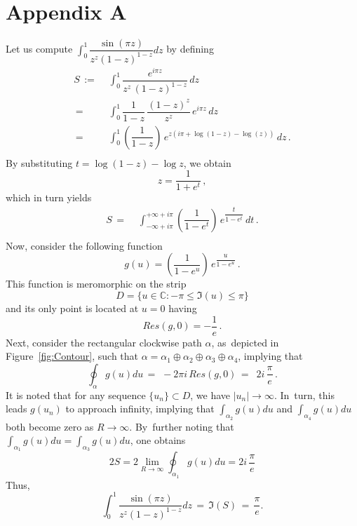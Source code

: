 \documentclass[sn-mathphys-num]{sn-jnl}%
\theoremstyle{thmstyleone}%
\theoremstyle{thmstyletwo}%
\theoremstyle{thmstylethree}%
\begin{document}
\section*{Appendix A}\label{app}
\noindent
Let us compute
$\int_{0}^{1} \dfrac{\sin (\pi z)}{z^z(1-z)^{1-z}} dz  $ by defining
\begin{equation}
	\begin{aligned}
		S
		\, := \, &  \, \int_{0}^{1} \dfrac{e^{i\pi z}}{z^z \, (1-z)^{1-z}}  \, dz   \\
		\, = \, &  \, \int_{0}^{1} \dfrac{1}{1-z} \, \dfrac{(1-z)^z}{z^z} \, e^{i\pi z} \, dz   \\
		\, = \, &  \,  \int_{0}^{1} \left(\dfrac{1}{1-z}\right) \, e^{z( i\pi + \log (1-z) - \log(z) )} \, dz \, .   \\
	\end{aligned}
\end{equation}
By substituting $t=\log (1-z) - \log z$, we obtain $$ z=\dfrac{1}{1+e^t} \, , $$ which in turn yields
\vspace{-6pt}
\begin{equation}
	\begin{aligned}
		S
		\, = \, &  \, \int_{-\infty+i\pi}^{+\infty+i\pi} \left(\dfrac{1}{1-e^t}\right) \, e^{\dfrac{t}{1-e^t}} \, dt \, .  \\
	\end{aligned}
\end{equation}
Now, consider the following function
\vspace{-3pt}
\begin{equation}
	g(u) =\left(\dfrac{1}{1-e^u}\right) \, e^{\dfrac{u}{1-e^u}} \, .
\end{equation}
This function is meromorphic on the strip $$ D = \{ u\in \mathbb{C}: -\pi \leq \Im(u) \leq \pi \} $$ and its only point is located at $u=0$ having
\begin{equation}
	Res(g,0) = -\frac{1}{e} \, .
\end{equation}
Next, consider the rectangular clockwise path $\alpha$, as~depicted in Figure~\ref{fig:Contour}, such that $\alpha = \alpha_1 \oplus \alpha_2 \oplus \alpha_3 \oplus \alpha_4$, implying that
\vspace{-1pt}
\begin{equation}
	\oint_{\alpha}g(u) du
	\, = \,   \, -2\pi i\, Res(g,0) \, = \,   \,\, 2 i \, \frac{\pi}{e} \, . 
\end{equation}	
\noindent It is noted that for any sequence $\{u_n\}\subset D$, we have $|u_n|\to \infty$. In~turn, this leads $g(u_n)$ to approach infinity, implying that $\int_{\alpha_2} g(u)du$ and $\int_{\alpha_4} g(u)du$ both become zero as $R\to \infty$. By~further noting that $\int_{\alpha_1} g(u)du = \int_{\alpha_3} g(u)du$, one obtains 
\begin{equation}
	2S = 2\lim\limits_{R \to \infty} \oint_{\alpha_1} g(u) du = 2i\, \dfrac{\pi}{e}
\end{equation}
Thus,
\begin{equation}
	\int_{0}^{1} \dfrac{\sin (\pi z)}{z^z(1-z)^{1-z}} dz \, = \, \Im(S) \, =  \, \frac{\pi}{e}.
\end{equation}
\end{document}
